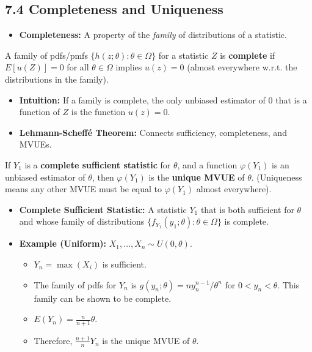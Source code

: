 \subsection{7.4 Completeness and Uniqueness}

\begin{itemize}
	\item \textbf{Completeness:} A property of the \textit{family} of distributions of a statistic.
\end{itemize}

\begin{definition}
A family of pdfs/pmfs $\{h(z; \theta): \theta \in \Omega\}$ for a statistic $Z$ is \textbf{complete} if $E[u(Z)] = 0$ for all $\theta \in \Omega$ implies $u(z) = 0$ (almost everywhere w.r.t. the distributions in the family).
\end{definition}
\begin{itemize}
	\item \textbf{Intuition:} If a family is complete, the only unbiased estimator of 0 that is a function of $Z$ is the function $u(z)=0$.
	\item \textbf{Lehmann-Scheffé Theorem:} Connects sufficiency, completeness, and MVUEs.
\end{itemize}

\begin{theorem}
If $Y_1$ is a \textbf{complete sufficient statistic} for $\theta$, and a function $\varphi(Y_1)$ is an unbiased estimator of $\theta$, then $\varphi(Y_1)$ is the \textbf{unique MVUE} of $\theta$. (Uniqueness means any other MVUE must be equal to $\varphi(Y_1)$ almost everywhere).
\end{theorem}
\begin{itemize}
	\item \textbf{Complete Sufficient Statistic:} A statistic $Y_1$ that is both sufficient for $\theta$ and whose family of distributions $\{f_{Y_1}(y_1; \theta): \theta \in \Omega\}$ is complete.
	\item \textbf{Example (Uniform):} $X_1, \dots, X_n \sim U(0, \theta)$.
	\begin{itemize}
		\item $Y_n = \max(X_i)$ is sufficient.
		\item The family of pdfs for $Y_n$ is $g(y_n; \theta) = n y_n^{n-1} / \theta^n$ for $0 < y_n < \theta$. This family can be shown to be complete.
		\item $E(Y_n) = \frac{n}{n+1}\theta$.
		\item Therefore, $\frac{n+1}{n} Y_n$ is the unique MVUE of $\theta$.
	\end{itemize}
\end{itemize}

